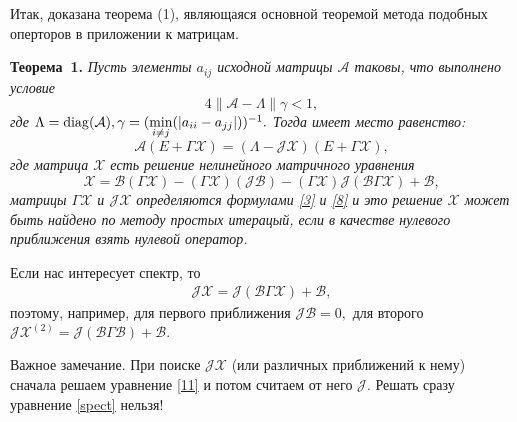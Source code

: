 Итак, доказана теорема (1), являющаяся основной теоремой метода подобных оперторов в приложении к матрицам.

\textbf{Теорема~1.}
{ \it Пусть элементы $a_{ij}$ исходной матрицы $\mathcal{A}$ таковы, что выполнено условие
$$
4\|\mathcal{A} - \Lambda\| \gamma < 1,
$$
где $\Lambda = \operatorname{diag}(\mathcal{A}), \gamma = (\min\limits_{i \neq j}(|a_{ii} - a_{jj}|))^{-1}.$
Тогда имеет место равенство:
$$
\mathcal{A}(E + \Gamma\mathcal{X}) = (\Lambda - \mathcal{JX})(E + \Gamma\mathcal{X}),
$$
где матрица $\mathcal{X}$ есть решение нелинейного матричного уравнения
$$
\mathcal{X} = \mathcal{B}(\Gamma\mathcal{X}) - (\Gamma\mathcal{X})(\mathcal{JB}) - (\Gamma\mathcal{X})\mathcal{J}(\mathcal{B}\Gamma\mathcal{X}) + \mathcal{B},
$$
матрицы $\Gamma\mathcal{X}$ и $\mathcal{JX}$ определяются формулами \eqref{3} и \eqref{8} и это решение $\mathcal{X}$ может быть найдено по методу простых итерацый, если в качестве нулевого приближения взять нулевой оператор.
}
 
Если нас интересует спектр, то
 \begin{eqnarray}
   \mathcal{JX} = \mathcal{J}(\mathcal{B}\Gamma\mathcal{X}) + \mathcal{B},
   \label{spect}
\end{eqnarray}
поэтому, например, для первого приближения $\mathcal{JB} = 0,$ для второго $\mathcal{JX}^{(2)} = \mathcal{J}(\mathcal{B}\Gamma\mathcal{B})+\mathcal{B}.$

Важное замечание. При поиске $\mathcal{JX}$ (или различных приближений к нему) сначала решаем уравнение \eqref{11} и потом считаем от него $\mathcal{J}.$ Решать сразу уравнение \eqref{spect} нельзя!